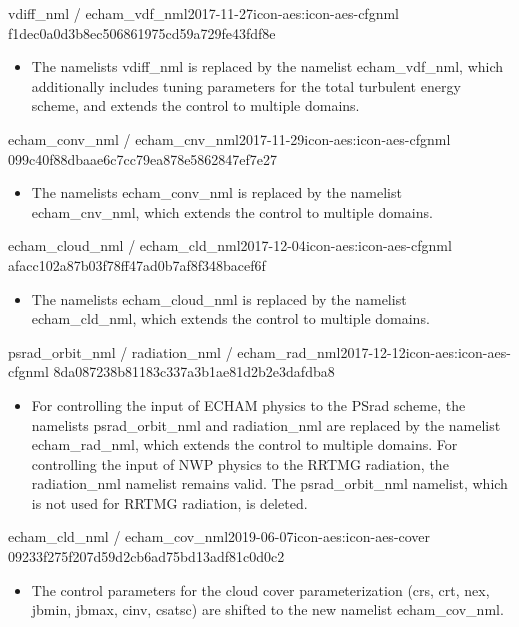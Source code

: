 \begin{changeitem}{vdiff\_nml / echam\_vdf\_nml}{2017-11-27}{icon-aes:icon-aes-cfgnml f1dec0a0d3b8ec506861975cd59a729fe43fdf8e}
  \begin{itemize}
   \item The namelists vdiff\_nml is replaced by the namelist echam\_vdf\_nml, which additionally includes tuning parameters for the total turbulent energy scheme, and extends the control to multiple domains.
  \end{itemize}
\end{changeitem}

\begin{changeitem}{echam\_conv\_nml / echam\_cnv\_nml}{2017-11-29}{icon-aes:icon-aes-cfgnml 099c40f88dbaae6c7cc79ea878e5862847ef7e27}
  \begin{itemize}
   \item The namelists echam\_conv\_nml is replaced by the namelist echam\_cnv\_nml, which extends the control to multiple domains.
  \end{itemize}
\end{changeitem}

\begin{changeitem}{echam\_cloud\_nml / echam\_cld\_nml}{2017-12-04}{icon-aes:icon-aes-cfgnml afacc102a87b03f78ff47ad0b7af8f348bacef6f}
  \begin{itemize}
   \item The namelists echam\_cloud\_nml is replaced by the namelist echam\_cld\_nml, which extends the control to multiple domains.
  \end{itemize}
\end{changeitem}

\begin{changeitem}{psrad\_orbit\_nml / radiation\_nml / echam\_rad\_nml}{2017-12-12}{icon-aes:icon-aes-cfgnml 8da087238b81183c337a3b1ae81d2b2e3dafdba8}
  \begin{itemize}
   \item For controlling the input of ECHAM physics to the PSrad scheme, the namelists psrad\_orbit\_nml and radiation\_nml are replaced by the namelist echam\_rad\_nml, which extends the control to multiple domains. For controlling the input of NWP physics to the RRTMG radiation, the radiation\_nml namelist remains valid. The psrad\_orbit\_nml namelist, which is not used for RRTMG radiation, is deleted.
  \end{itemize}
\end{changeitem}

\begin{changeitem}{echam\_cld\_nml / echam\_cov\_nml}{2019-06-07}{icon-aes:icon-aes-cover 09233f275f207d59d2cb6ad75bd13adf81c0d0c2}
  \begin{itemize}
   \item The control parameters for the  cloud cover parameterization (crs, crt, nex, jbmin, jbmax, cinv, csatsc)  are shifted to the new namelist echam\_cov\_nml.
  \end{itemize}
\end{changeitem}

